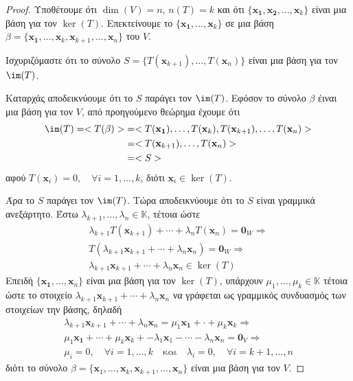 \begin{proof}
  Υποθέτουμε ότι $ \dim(V) = n $, $ n(T) = k $ και ότι $ \{ \mathbf{x_{1}},
  \mathbf{x_{2}}, \ldots, \mathbf{x}_{k} \} $ είναι μια βάση για τον $ \ker(T) $. 
  Επεκτείνουμε το $ \{ \mathbf{x_{1}}, \ldots, \mathbf{x}_{k} \} $ σε μια βάση 
  $ \beta = \{ \mathbf{x_{1}}, \ldots, \mathbf{x}_{k}, \mathbf{x}_{k+1}, \ldots,
  \mathbf{x}_{n} \} $ του $V$.

  Ισχυριζόμαστε ότι το σύνολο 
  $ S = \{ T(\mathbf{x}_{k+1}), \ldots, T(\mathbf{x}_{n}) \} $ είναι μια βάση για τον 
  $ \im(T) $.

  Καταρχάς αποδεικνύουμε ότι το $S$ παράγει τον $ \im(T) $. Εφόσον το σύνολο $ \beta $ 
  έιναι μια βάση για τον $V$, από προηγούμενο θεώρημα έχουμε ότι 
  \begin{align*}
    \im(T) = < T(\beta) >&= < T(\mathbf{x_{1}}), \ldots, T(\mathbf{x}_{k}),
    T(\mathbf{x}_{k+1}), \ldots, T(\mathbf{x}_{n}) > \\ 
                         &= < T(\mathbf{x}_{k+1}), \ldots, T(\mathbf{x}_{n}) > \\
                         &= < S > 
  \end{align*}
  αφού $ T(\mathbf{x}_{i}) = 0, \quad \forall i = 1,\ldots, k $, διότι $ \mathbf{x}_{i}
  \in \ker(T) $. 

  Άρα το $S$ παράγει τον $ \im(T) $. Τώρα αποδεικνύουμε ότι το $S$ είναι γραμμικά 
  ανεξάρτητο. Έστω $ \lambda _{k+1}, \ldots, \lambda _{n} \in \mathbb{K} $, τέτοια ώστε 
  \begin{align*} 
    \lambda _{k+1} T(\mathbf{x}_{k+1}) + \cdots + \lambda _{n} T(\mathbf{x}_{n}) =
    \mathbf{0}_{W} \Rightarrow \\
    T(\lambda _{k+1} \mathbf{x}_{k+1} + \cdots + \lambda _{n} \mathbf{x}_{n}) = 
    \mathbf{0}_{W} \Rightarrow \\
    \lambda _{k+1} \mathbf{x}_{k+1} + \cdots + \lambda _{n} \mathbf{x}_{n} \in \ker(T) 
  \end{align*} 
  Επειδή $ \{ \mathbf{x_{1}}, \dots, \mathbf{x}_{n} \} $ είναι μια βάση για τον 
  $ \ker(T) $, υπάρχουν $ \mu _{1}, \ldots, \mu _{k} \in \mathbb{K} $ τέτοια ώστε 
  το στοιχείο $ \lambda _{k+1} \mathbf{x}_{k+1} + \cdots + \lambda _{n} \mathbf{x}_{n} $ 
  να γράφεται ως γραμμικός συνδυασμός των στοιχείων την βάσης, δηλαδή
  \begin{align*}
    \lambda _{k+1} \mathbf{x}_{k+1} + \cdots + \lambda _{n} \mathbf{x}_{n} = \mu _{1} 
    \mathbf{x_{1}} + \cdot + \mu _{k} \mathbf{x}_{k} \Rightarrow \\
    \mu _{1} \mathbf{x_{1}} + \cdots + \mu _{k} \mathbf{x}_{k} + -\lambda _{1}
    \mathbf{x}_{1} - \cdots - \lambda _{n} \mathbf{x}_{n} = \mathbf{0}_{V} \Rightarrow \\
    \mu _{i} = 0, \quad \forall i = 1, \ldots, k \quad \text{και} \quad \lambda _{i} = 
    0, \quad \forall i = k+1, \ldots, n
   \end{align*} 
   διότι το σύνολο $ \beta = \{ \mathbf{x}_{1}, \ldots, \mathbf{x}_{k}, \mathbf{x}_{k+1},
   \ldots, \mathbf{x}_{n}\}  $ είναι μια βάση για τον $V$. 


\end{proof}
